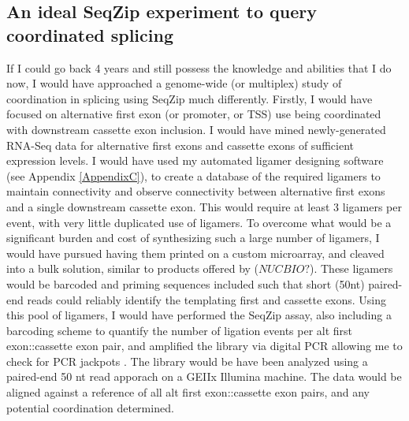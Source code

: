   \subsection{An ideal SeqZip experiment to query coordinated splicing} \label{subsec: Ideal multiplex study}
    If I could go back 4 years and still possess the knowledge and abilities that I do now, I would have approached a genome-wide (or multiplex) study of coordination in splicing using SeqZip much differently. Firstly, I would have focused on alternative first exon (or promoter, or TSS) use being coordinated with downstream cassette exon inclusion. I would have mined newly-generated RNA-Seq data \citep{Wang2008, Pan2008} for alternative first exons and cassette exons of sufficient expression levels. I would have used my automated ligamer designing software (see Appendix \ref{AppendixC}), to create a database of the required ligamers to maintain connectivity and observe connectivity between alternative first exons and a single downstream cassette exon. This would require at least 3 ligamers per event, with very little duplicated use of ligamers. To overcome what would be a significant burden and cost of synthesizing such a large number of ligamers, I would have pursued having them printed on a custom microarray, and cleaved into a bulk solution, similar to products offered by ($NUC BIO?$). These ligamers would be barcoded and priming sequences included such that short (50nt) paired-end reads could reliably identify the templating first and cassette exons. Using this pool of ligamers, I would have performed the SeqZip assay, also including a barcoding scheme to quantify the number of ligation events per alt first exon::cassette exon pair, and amplified the library via digital PCR allowing me to check for PCR jackpots \citep{Shiroguchi2012a}. The library would be have been analyzed using a paired-end 50 nt read apporach on a GEIIx Illumina machine. The data would be aligned against a reference of all alt first exon::cassette exon pairs, and any potential coordination determined.

